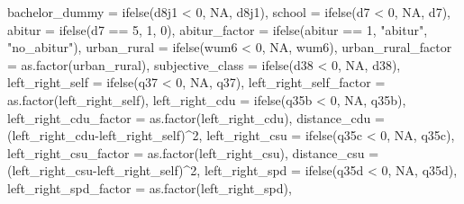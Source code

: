 \documentclass[
]{article}
\newenvironment{Shaded}{\begin{snugshade}}{\end{snugshade}}
\newcommand{\AttributeTok}[1]{\textcolor[rgb]{0.77,0.63,0.00}{#1}}
\newcommand{\ConstantTok}[1]{\textcolor[rgb]{0.00,0.00,0.00}{#1}}
\newcommand{\DecValTok}[1]{\textcolor[rgb]{0.00,0.00,0.81}{#1}}
\newcommand{\FunctionTok}[1]{\textcolor[rgb]{0.00,0.00,0.00}{#1}}
\newcommand{\NormalTok}[1]{#1}
\newcommand{\SpecialCharTok}[1]{\textcolor[rgb]{0.00,0.00,0.00}{#1}}
\newcommand{\StringTok}[1]{\textcolor[rgb]{0.31,0.60,0.02}{#1}}
\begin{document}
\begin{Shaded}
\begin{Highlighting}[]
         \AttributeTok{bachelor\_dummy =} \FunctionTok{ifelse}\NormalTok{(d8j1 }\SpecialCharTok{\textless{}} \DecValTok{0}\NormalTok{, }\ConstantTok{NA}\NormalTok{, d8j1),}
         \AttributeTok{school =} \FunctionTok{ifelse}\NormalTok{(d7 }\SpecialCharTok{\textless{}} \DecValTok{0}\NormalTok{, }\ConstantTok{NA}\NormalTok{, d7),}
         \AttributeTok{abitur =} \FunctionTok{ifelse}\NormalTok{(d7 }\SpecialCharTok{==} \DecValTok{5}\NormalTok{, }\DecValTok{1}\NormalTok{, }\DecValTok{0}\NormalTok{),}
         \AttributeTok{abitur\_factor =} \FunctionTok{ifelse}\NormalTok{(abitur }\SpecialCharTok{==} \DecValTok{1}\NormalTok{, }\StringTok{"abitur"}\NormalTok{, }\StringTok{"no\_abitur"}\NormalTok{),}
         \AttributeTok{urban\_rural =} \FunctionTok{ifelse}\NormalTok{(wum6 }\SpecialCharTok{\textless{}} \DecValTok{0}\NormalTok{, }\ConstantTok{NA}\NormalTok{, wum6),}
         \AttributeTok{urban\_rural\_factor =} \FunctionTok{as.factor}\NormalTok{(urban\_rural),}
         \AttributeTok{subjective\_class =} \FunctionTok{ifelse}\NormalTok{(d38 }\SpecialCharTok{\textless{}} \DecValTok{0}\NormalTok{, }\ConstantTok{NA}\NormalTok{, d38),}
         \AttributeTok{left\_right\_self =} \FunctionTok{ifelse}\NormalTok{(q37 }\SpecialCharTok{\textless{}} \DecValTok{0}\NormalTok{, }\ConstantTok{NA}\NormalTok{, q37),}
         \AttributeTok{left\_right\_self\_factor =} \FunctionTok{as.factor}\NormalTok{(left\_right\_self),}
         \AttributeTok{left\_right\_cdu =} \FunctionTok{ifelse}\NormalTok{(q35b }\SpecialCharTok{\textless{}} \DecValTok{0}\NormalTok{, }\ConstantTok{NA}\NormalTok{, q35b),}
         \AttributeTok{left\_right\_cdu\_factor =} \FunctionTok{as.factor}\NormalTok{(left\_right\_cdu),}
         \AttributeTok{distance\_cdu =}\NormalTok{ (left\_right\_cdu}\SpecialCharTok{{-}}\NormalTok{left\_right\_self)}\SpecialCharTok{\^{}}\DecValTok{2}\NormalTok{,}
         \AttributeTok{left\_right\_csu =} \FunctionTok{ifelse}\NormalTok{(q35c }\SpecialCharTok{\textless{}} \DecValTok{0}\NormalTok{, }\ConstantTok{NA}\NormalTok{, q35c),}
         \AttributeTok{left\_right\_csu\_factor =} \FunctionTok{as.factor}\NormalTok{(left\_right\_csu),}
         \AttributeTok{distance\_csu =}\NormalTok{ (left\_right\_csu}\SpecialCharTok{{-}}\NormalTok{left\_right\_self)}\SpecialCharTok{\^{}}\DecValTok{2}\NormalTok{,}
         \AttributeTok{left\_right\_spd =} \FunctionTok{ifelse}\NormalTok{(q35d }\SpecialCharTok{\textless{}} \DecValTok{0}\NormalTok{, }\ConstantTok{NA}\NormalTok{, q35d),}
         \AttributeTok{left\_right\_spd\_factor =} \FunctionTok{as.factor}\NormalTok{(left\_right\_spd),}

\end{Highlighting}
\end{Shaded}
\end{document}

